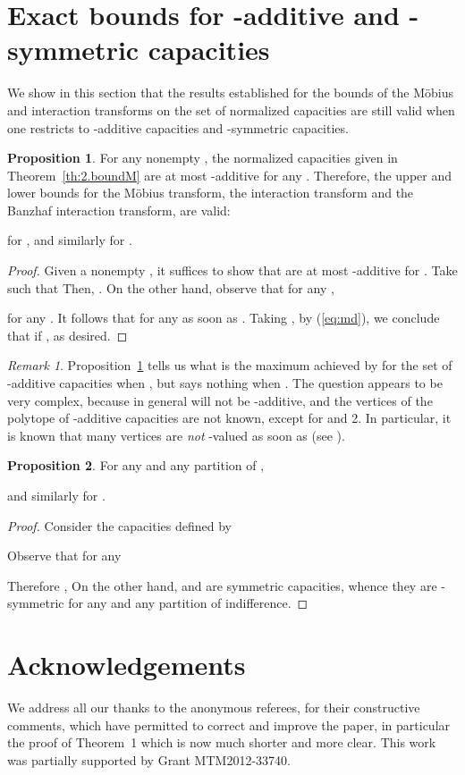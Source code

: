 \documentclass[12pt,a4paper]{article}
\theoremstyle{definition}
\newtheorem{proposition}{Proposition}
\theoremstyle{remark}
\newtheorem{remark}{Remark}
\begin{document}
\section{Exact bounds for -additive and -symmetric capacities}
We show in this section that the results established for the bounds of the
M\"obius and interaction transforms on the set of normalized capacities are
still valid when one restricts to -additive capacities and -symmetric capacities.

\begin{proposition}\label{prop:1}
For any nonempty , the normalized capacities 
given in Theorem~\ref{th:2.boundM} are at most -additive for any
. Therefore, the upper and lower bounds for the
M\"obius transform, the interaction transform and the Banzhaf interaction
transform, are valid:

for ,
and similarly for .
\end{proposition}
\begin{proof}
Given a nonempty , it suffices to show that  are at
most -additive for . Take  such that 
Then, . On the other hand, observe that for
  any , 

for any . It follows that  for any  as soon as
. Taking , by (\ref{eq:md}), we conclude that
 if , as desired.
\end{proof}
 \begin{remark} Proposition~\ref{prop:1} tells us what is the maximum
    achieved by  for the set of -additive capacities when
    , but says nothing when . The question
    appears to be very complex, because in general  will not be
    -additive, and the vertices of the polytope of -additive capacities
    are not known, except for  and 2. In particular, it is known that many
    vertices are \textit{not} -valued as soon as  (see
    \cite{micogi06}).
\end{remark}
\begin{proposition}
For any  and any partition  of ,


and similarly for .
\end{proposition}
\begin{proof}
Consider the capacities defined by

 Observe that
 for any 

Therefore , 
On the other hand,  and  are symmetric capacities, whence
they are -symmetric for any  and any partition of indifference.
\end{proof}

\section{{\bf Acknowledgements}}

We address all our thanks to the anonymous referees, for their constructive
comments, which have permitted to correct and improve the paper, in particular
the proof of Theorem~1 which is now much shorter and more clear.  This work was
partially supported by Grant MTM2012-33740.





\end{document}
